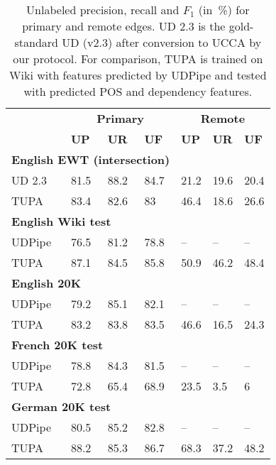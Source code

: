 \documentclass[11pt,a4paper]{article}
\begin{document}
\begin{table}[t]
\centering
\begin{tabular}{l|lll|lll}
& \multicolumn{3}{c|}{\footnotesize \bf Primary} & \multicolumn{3}{c}{\footnotesize \bf Remote} \\
& \footnotesize \textbf{UP} & \footnotesize \textbf{UR} & \footnotesize \textbf{UF}
& \footnotesize \textbf{UP} & \footnotesize \textbf{UR} & \footnotesize \textbf{UF} \\
\hline
\multicolumn{4}{l|}{\small \bf English EWT (intersection)} & \\
\footnotesize UD 2.3
& 81.5 & 88.2 & 84.7 & 21.2 & 19.6 & 20.4 \\
\footnotesize TUPA
& 83.4 & 82.6 & 83 & 46.4 & 18.6 & 26.6 \\
\multicolumn{4}{l|}{\small \bf English Wiki test} & \\
\footnotesize UDPipe
& 76.5 & 81.2 & 78.8 & -- & -- & -- \\
\footnotesize TUPA
& 87.1 & 84.5 & 85.8 & 50.9 & 46.2 & 48.4 \\
\multicolumn{4}{l|}{\small \bf English 20K} & \\
\footnotesize UDPipe
& 79.2 & 85.1 & 82.1 & -- & -- & -- \\
\footnotesize TUPA
& 83.2 & 83.8 & 83.5 & 46.6 & 16.5 & 24.3 \\
\multicolumn{4}{l|}{\small \bf French 20K test} & \\
\footnotesize UDPipe
& 78.8 & 84.3 & 81.5 & -- & -- & -- \\
\footnotesize TUPA
& 72.8 & 65.4 & 68.9 & 23.5 & 3.5 & 6 \\
\multicolumn{4}{l|}{\small \bf German 20K test} & \\
\footnotesize UDPipe
& 80.5 & 85.2 & 82.8 & -- & -- & -- \\
\footnotesize TUPA
& 88.2 & 85.3 & 86.7 & 68.3 & 37.2 & 48.2
\end{tabular}
\caption{
Unlabeled precision, recall and $F_1$ (in~\%) for primary and remote edges.
UD 2.3 is the gold-standard UD (v2.3) after conversion to UCCA by our protocol.
For comparison, TUPA \protect\cite{hershcovich2017a} is trained on Wiki with features predicted by UDPipe
and tested with predicted POS and dependency features.
\label{tab:conversion_results_unlabeled}}
\end{table}
\end{document}
